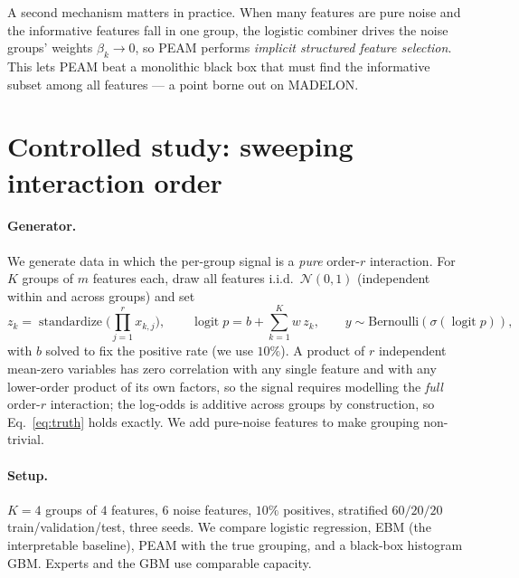 \documentclass{article}
\newcommand{\logit}{\operatorname{logit}}
\newcommand{\sigm}{\sigma}
\begin{document}
A second mechanism matters in practice. When many features are pure noise and
the informative features fall in one group, the logistic combiner drives the
noise groups' weights $\beta_k \to 0$, so PEAM performs \emph{implicit structured
feature selection}. This lets PEAM beat a monolithic black box that must find the
informative subset among all features --- a point borne out on MADELON.

\section{Controlled study: sweeping interaction order}
\label{sec:synthetic}

\paragraph{Generator.} We generate data in which the per-group signal is a
\emph{pure} order-$r$ interaction. For $K$ groups of $m$ features each, draw all
features i.i.d.\ $\mathcal N(0,1)$ (independent within and across groups) and set
\begin{equation}
z_k = \operatorname{standardize}\Big(\textstyle\prod_{j=1}^{r} x_{k,j}\Big), \qquad
\logit p = b + \sum_{k=1}^K w\, z_k, \qquad y \sim \text{Bernoulli}(\sigm(\logit p)),
\end{equation}
with $b$ solved to fix the positive rate (we use $10\%$). A product of $r$
independent mean-zero variables has zero correlation with any single feature and
with any lower-order product of its own factors, so the signal requires modelling
the \emph{full} order-$r$ interaction; the log-odds is additive across groups by
construction, so Eq.~\eqref{eq:truth} holds exactly. We add pure-noise features
to make grouping non-trivial.

\paragraph{Setup.} $K{=}4$ groups of $4$ features, $6$ noise features,
$10\%$ positives, stratified $60/20/20$ train/validation/test, three seeds. We
compare logistic regression, EBM (the interpretable baseline), PEAM with the true
grouping, and a black-box histogram GBM. Experts and the GBM use comparable
capacity.
\end{document}
